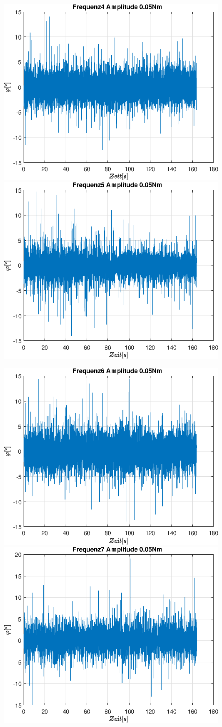 \documentclass{article}
\begin{document}
\begin{figure}[!h]
\includegraphics[width=0.5\linewidth]{img/phi_sinefreq_4}
\includegraphics[width=0.5\linewidth]{img/phi_sinefreq_5}
\end{figure}
\begin{figure}[!h]
\includegraphics[width=0.5\linewidth]{img/phi_sinefreq_6}
\includegraphics[width=0.5\linewidth]{img/phi_sinefreq_7}
\end{figure}
\end{document}
